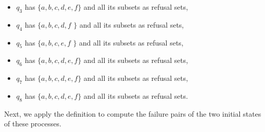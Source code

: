 \documentclass[11pt]{article}
\theoremstyle{definition}
\newcommand{\cmark}{\ding{51}}
\theoremstyle{plain}
\theoremstyle{definition}
\begin{document}
\begin{itemize}
\begin{itemize}
		\item $ q_3 $ has $ \{a, b, c, d, e, f\} $ and all its subsets as refusal sets,
		\item $ q_4 $ has $ \{a, b, c, d, f$ \cmark $\} $ and all its subsets as refusal sets,
		\item $ q_5 $ has $ \{a, b, c, e, f$ \cmark $\} $ and all its subsets as refusal sets,
		\item $ q_6 $ has $ \{a, b, c, d, e, f\} $ and all its subsets as refusal sets,
		\item $ q_7 $ has $ \{a, b, c, d, e, f\} $ and all its subsets as refusal sets,
		\item $ q_8 $ has $ \{a, b, c, d, e, f\} $ and all its subsets as refusal sets.
	\end{itemize}
\end{itemize}

Next, we apply the definition to compute the failure pairs of the two initial states of these processes.
\end{document}
